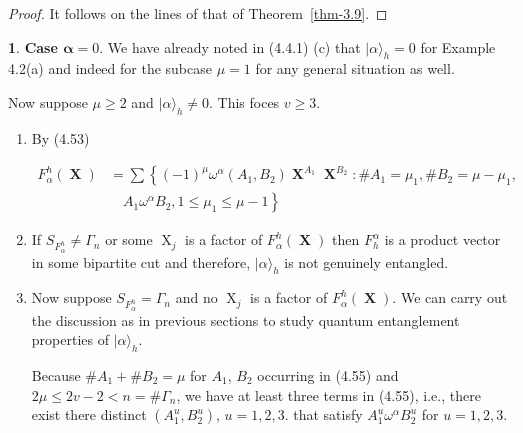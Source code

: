 \documentclass[a4paper,12pt]{article}
\DeclareMathOperator{\x}{\mathrm{X}}
\theoremstyle{definition}
\theoremstyle{underlinethm}
\theoremstyle{definition}
\newtheorem{subsubsec}{}[subsection]
\begin{document}
\begin{proof}
It follows on the lines of that of Theorem~\eqref{thm-3.9}.
\end{proof}

\begin{subsubsec}\label{subsubsection-4.4.2}
\textbf{Case $\boldsymbol{\alpha} =0$}. We have already noted in (4.4.1) (c) that $| \alpha \rangle_{h} = 0$ for Example 4.2(a) and indeed for the subcase $\mu=1$ for any general situation as well.

Now suppose $\mu \geq 2$ and $| \alpha \rangle_{h} \neq 0$. This foces $v \geq 3$.

\end{subsubsec}

\begin{enumerate}[label=(\alph*)]

\item By (4.53)

\begin{align*}
F_{\alpha}^{h}(\boldsymbol{\x}) &= \sum \left\{(-1)^{\mu} \omega^{\alpha}(A_{1}, B_{2}) \boldsymbol{\x}^{A_{1}} \boldsymbol{\x}^{B_{2}} : \# A_{1} = \mu_{1}, \# B_{2} = \mu-\mu_{1},\right.\\
&\left.\quad A_{1}\omega^{\alpha} B_{2}, 1 \leq \mu_{1} \leq \mu-1\right\}\tag{4.55}\label{eq-4.55} 
\end{align*}

\item If $S_{F^{h}_{\alpha}} \neq \Gamma_{n}$ or some $\x_{j}$ is a factor of $F_{\alpha}^{h}(\boldsymbol{\x})$ then $F_{h}^{\alpha}$ is a product vector in some bipartite cut and therefore, $| \alpha \rangle_{h}$ is not genuinely entangled. 

\item Now suppose $S_{F_{\alpha}^{h}}= \Gamma_{n}$ and no $\x_{j}$ is a factor of $F_{\alpha}^{h}(\boldsymbol{\x})$. We can carry out the discussion as in previous sections to study quantum entanglement properties of $| \alpha \rangle_{h}$.

Because $\# A_{1} + \# B_{2} = \mu$ for $A_{1}$, $B_{2}$ occurring in (4.55) and $2\mu \leq 2v-2 < n = \# \Gamma_{n}$, we have at least three terms in (4.55), i.e., there exist there distinct $(A_{1}^{u}, B_{2}^{u})$, $u= 1,2,3$. that satisfy $A^{u}_{1} \omega^{\alpha} B^{u}_{2}$ for $u=1,2,3$. 
\end{enumerate}
\end{document}
